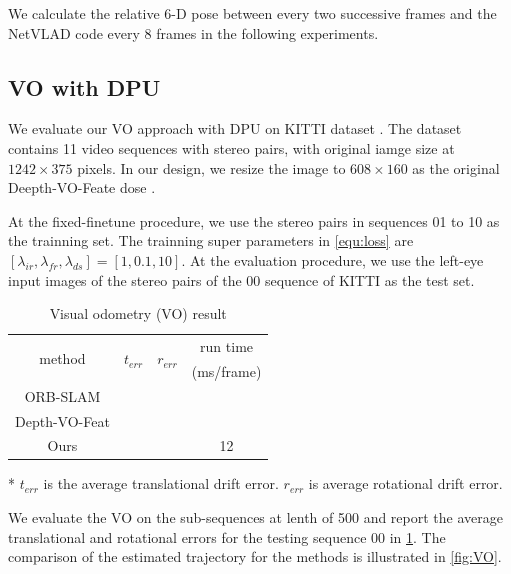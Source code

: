 We calculate the relative 6-D pose between every two successive frames and the NetVLAD code every $8$ frames in the following experiments.

\subsection{VO with DPU}

We evaluate our VO approach with DPU on KITTI dataset \cite{geiger2013vision}. The dataset contains 11 video sequences with stereo pairs, with original iamge size at $1242 \times 375$ pixels. In our design, we resize the image to $608 \times 160$ as the original Deepth-VO-Feate dose \cite{Zhan:2018e92}.

At the fixed-finetune procedure, we use the stereo pairs in sequences 01 to 10 as the trainning set. The trainning  super parameters in \cref{equ:loss} are $[\lambda_{ir},\lambda_{fr},\lambda_{ds}] = [1,0.1,10]$. At the evaluation procedure, we use the left-eye input images of the stereo pairs of the 00 sequence of KITTI as the test set.


\begin{table}[ht]
    \centering
    \caption{Visual odometry (VO) result}
    \footnotesize
    \begin{threeparttable}
\begin{tabular}{|c|c|c|c|}
  \hline
  \multirow{2}[2]{*}{method} & \multirow{2}[2]{*}{$t_{err}$} & \multirow{2}[2]{*}{$r_{err}$} & run time  \bigstrut[t]\\
        &       &       & (ms/frame) \bigstrut[b]\\
  \hline
  ORB-SLAM  &       &       &  \bigstrut\\
  \hline
  Depth-VO-Feat &       &       &  \bigstrut\\
  \hline
  Ours  &       &       & 12 \bigstrut\\
  \hline
  \end{tabular}%
  
  \begin{tablenotes}
        \item[*] $t_{err}$ is the average translational drift error. $r_{err}$ is average rotational drift error.
        \end{tablenotes}
      \end{threeparttable}
    \label{tab:VO}%
  \end{table}%

We evaluate the VO on the sub-sequences at lenth of 500 and report the average translational and rotational errors for the testing sequence 00 in \cref{tab:VO}.  The comparison of the estimated trajectory for the methods is illustrated in \cref{fig:VO}.



